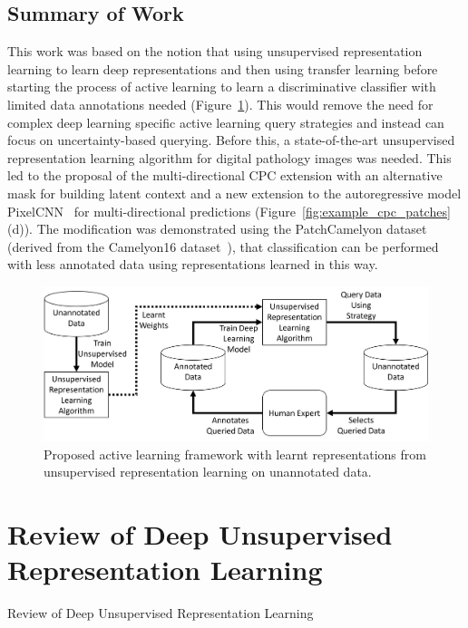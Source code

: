 \subsection{Summary of Work}
\label{subsec:unsupervised_summary}
This work was based on the notion that using unsupervised representation learning to learn deep representations and then using transfer learning before starting the process of active learning to learn a discriminative classifier with limited data annotations needed (Figure~\ref{fig:active_unsupervised_learning_framework}). This would remove the need for complex deep learning specific active learning query strategies and instead can focus on uncertainty-based querying. Before this, a state-of-the-art unsupervised representation learning algorithm for digital pathology images was needed. This led to the proposal of the multi-directional CPC extension with an alternative mask for building latent context and a new extension to the autoregressive model PixelCNN~\citep{oord2016pixel} for multi-directional predictions (Figure~\ref{fig:example_cpc_patches}(d)). The modification was demonstrated using the PatchCamelyon dataset~\citep{veeling2018rotation} (derived from the Camelyon16 dataset~\citep{litjens20181399}), that classification can be performed with less annotated data using representations learned in this way.

\begin{figure}
	\centering
	\includegraphics[width=\textwidth]{images/active_unsupervised_learning.png}
	\caption{Proposed active learning framework with learnt representations from unsupervised representation learning on unannotated data.}
	\label{fig:active_unsupervised_learning_framework}
\end{figure}



\section{Review of Deep Unsupervised Representation Learning}
\label{sec:unsupervised_review}
Review of Deep Unsupervised Representation Learning

